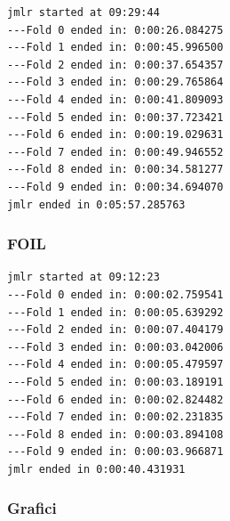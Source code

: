 \begin{verbatim}
jmlr started at 09:29:44
---Fold 0 ended in: 0:00:26.084275
---Fold 1 ended in: 0:00:45.996500
---Fold 2 ended in: 0:00:37.654357
---Fold 3 ended in: 0:00:29.765864
---Fold 4 ended in: 0:00:41.809093
---Fold 5 ended in: 0:00:37.723421
---Fold 6 ended in: 0:00:19.029631
---Fold 7 ended in: 0:00:49.946552
---Fold 8 ended in: 0:00:34.581277
---Fold 9 ended in: 0:00:34.694070
jmlr ended in 0:05:57.285763
\end{verbatim}
\subsubsection{FOIL}
\begin{table}[h!tbp]
\caption[]{}
\label{tab:ris}
\end{table}

\begin{verbatim}
jmlr started at 09:12:23
---Fold 0 ended in: 0:00:02.759541
---Fold 1 ended in: 0:00:05.639292
---Fold 2 ended in: 0:00:07.404179
---Fold 3 ended in: 0:00:03.042006
---Fold 4 ended in: 0:00:05.479597
---Fold 5 ended in: 0:00:03.189191
---Fold 6 ended in: 0:00:02.824482
---Fold 7 ended in: 0:00:02.231835
---Fold 8 ended in: 0:00:03.894108
---Fold 9 ended in: 0:00:03.966871
jmlr ended in 0:00:40.431931
\end{verbatim}
\subsubsection{Grafici}
